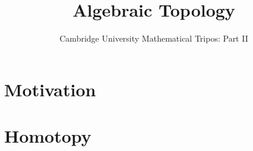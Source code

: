 \documentclass{article}
\title{Algebraic Topology}
\author{Cambridge University Mathematical Tripos: Part II}
\begin{document}
\maketitle

\tableofcontentsnewpage{}

\section{Motivation}

\section{Homotopy}

\end{document}
